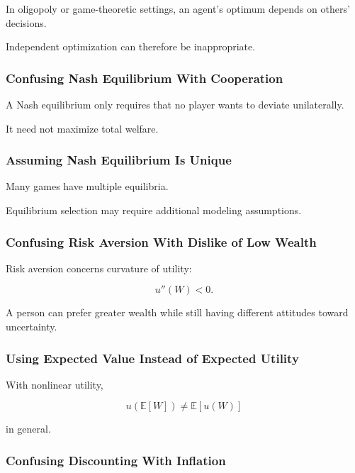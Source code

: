 In oligopoly or game-theoretic settings, an agent's optimum depends on others'
decisions.

Independent optimization can therefore be inappropriate.

\subsubsection{Confusing Nash Equilibrium With Cooperation}

A Nash equilibrium only requires that no player wants to deviate
unilaterally.

It need not maximize total welfare.

\subsubsection{Assuming Nash Equilibrium Is Unique}

Many games have multiple equilibria.

Equilibrium selection may require additional modeling assumptions.

\subsubsection{Confusing Risk Aversion With Dislike of Low Wealth}

Risk aversion concerns curvature of utility:

\[
u''(W)<0.
\]

A person can prefer greater wealth while still having different attitudes
toward uncertainty.

\subsubsection{Using Expected Value Instead of Expected Utility}

With nonlinear utility,

\[
u(\mathbb{E}[W])
\neq
\mathbb{E}[u(W)]
\]

in general.

\subsubsection{Confusing Discounting With Inflation}

